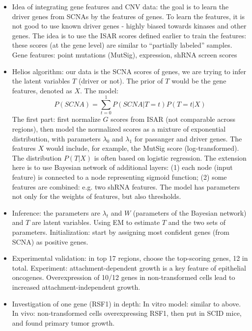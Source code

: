 \documentclass{report}
\begin{document}
\begin{itemize}
	\item Idea of integrating gene features and CNV data: the goal is to learn the driver genes from SCNAs by the features of genes. To learn the features, it is not good to use known driver genes - highly biased towards kinases and other genes. The idea is to use the ISAR scores defined earlier to train the features: these scores (at the gene level) are similar to ``partially labeled'' samples. Gene features: point mutations (MutSig), expression, shRNA screen scores
	
	\item Helios algorithm: our data is the SCNA scores of genes, we are trying to infer the latent variables $T$ (driver or not). The prior of $T$ would be the gene features, denoted as $X$. The model: 
	\begin{equation}
	P(SCNA) = \sum_{t=0}^1 P(SCNA|T=t) P(T=t|X)
	\end{equation}
	The first part: first normalize $G$ scores from ISAR (not comparable across regions), then model the normalized scores as a mixture of exponential distribution, with parameters $\lambda_0$ and $\lambda_1$ for passanger and driver genes. The features $X$ would include, for example, the MutSig score (log-transformed). The distribution $P(T|X)$ is often based on logistic regression. The extension here is to use Bayesian network of additional layers: (1) each node (input feature) is connected to a node representing sigmoid function; (2) some features are combined: e.g. two shRNA features. The model has parameters not only for the weights of features, but also thresholds. 
	
	\item Inference: the parameters are $\lambda_t$ and $W$ (parameters of the Bayesian network) and $T$ are latent variables. Using EM to estimate $T$ and the two sets of parameters. Initialization: start by assigning most confident genes (from SCNA) as positive genes. 
	
	\item Experimental validation: in top 17 regions, choose the top-scoring genes, 12 in total. Experiment: attachment-dependent growth is a key feature of epithelial oncogenes. Overexpression of 10/12 genes in non-transformed cells lead to increased attachment-independent growth.
	
	\item Investigation of one gene (RSF1) in depth: In vitro model: similar to above. In vivo: non-transformed cells overexpressing RSF1, then put in SCID mice, and found primary tumor growth.
	

\end{itemize}
\end{document}
